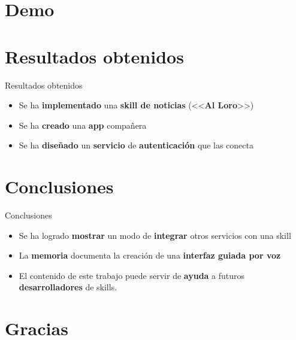 \documentclass{beamer}
\begin{document}
  \section{Demo}

  \section{Resultados obtenidos}
 
  \begin{frame}{Resultados obtenidos}
    \begin{itemize}
      \setlength\itemsep{1.5em}
      \item Se ha \textbf{implementado} una \textbf{skill de noticias} (<<\textbf{Al Loro}>>)
      \item Se ha \textbf{creado} una \textbf{app} compañera
      \item Se ha \textbf{diseñado} un \textbf{servicio} de \textbf{autenticación} que las conecta
    \end{itemize}
  \end{frame}

  \section{Conclusiones} %

  \begin{frame}{Conclusiones}
    \begin{itemize}
      \setlength\itemsep{1.5em}
      \item Se ha logrado \textbf{mostrar} un modo de \textbf{integrar} otros servicios con una skill
      \item La \textbf{memoria} documenta la creación de una \textbf{interfaz guiada por voz}
      \item El contenido de este trabajo puede servir de \textbf{ayuda} a futuros \textbf{desarrolladores} de skills.
    \end{itemize}
  \end{frame}

  \section*{Gracias}
\end{document}
